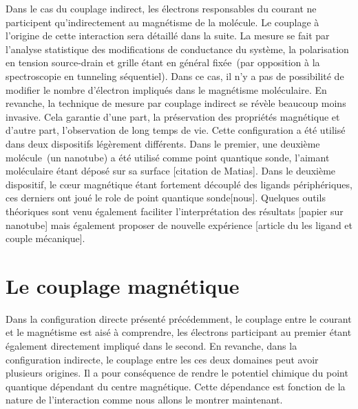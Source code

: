 Dans le cas du couplage indirect, les électrons responsables du courant ne participent qu'indirectement au magnétisme de la molécule. Le couplage à l'origine de cette interaction sera détaillé dans la suite. La mesure se fait par l'analyse statistique des modifications de conductance du système, la polarisation en tension source-drain et grille étant en général fixée~(par opposition à la spectroscopie en tunneling séquentiel). Dans ce cas, il n'y a pas de possibilité de modifier le nombre d'électron impliqués dans le magnétisme moléculaire. En revanche, la technique de mesure par couplage indirect se révèle beaucoup moins invasive. Cela garantie d'une part, la préservation des propriétés magnétique et d'autre part, l'observation de long temps de vie. Cette configuration a été utilisé dans deux dispositifs légèrement différents. Dans le premier, une deuxième molécule~(un nanotube) a été utilisé comme point quantique sonde, l'aimant moléculaire étant déposé sur sa surface [citation de Matias]. Dans le deuxième dispositif, le cœur magnétique étant fortement découplé des ligands périphériques, ces derniers ont joué le role de point quantique sonde[nous]. Quelques outils théoriques sont venu également faciliter l'interprétation des résultats [papier sur nanotube] mais également proposer de nouvelle expérience [article du les ligand et couple mécanique].

\section{Le couplage magnétique}
Dans la configuration directe présenté précédemment, le couplage entre le courant et le magnétisme est aisé à comprendre, les électrons participant au premier étant également directement impliqué dans le second. En revanche, dans la configuration indirecte, le couplage entre les ces deux domaines peut avoir plusieurs origines. Il a pour conséquence de rendre le potentiel chimique du point quantique dépendant du centre magnétique. Cette dépendance est fonction de la nature de l'interaction comme nous allons le montrer maintenant.

